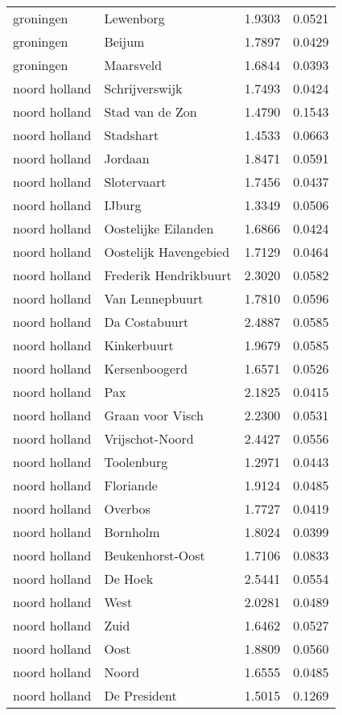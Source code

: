 \begin{longtable}{llcc}
groningen & Lewenborg & 1.9303 & 0.0521 \\
groningen & Beijum & 1.7897 & 0.0429 \\
groningen & Maarsveld & 1.6844 & 0.0393 \\
noord holland & Schrijverswijk & 1.7493 & 0.0424 \\
noord holland & Stad van de Zon & 1.4790 & 0.1543 \\
noord holland & Stadshart & 1.4533 & 0.0663 \\
noord holland & Jordaan & 1.8471 & 0.0591 \\
noord holland & Slotervaart & 1.7456 & 0.0437 \\
noord holland & IJburg & 1.3349 & 0.0506 \\
noord holland & Oostelijke Eilanden & 1.6866 & 0.0424 \\
noord holland & Oostelijk Havengebied & 1.7129 & 0.0464 \\
noord holland & Frederik Hendrikbuurt & 2.3020 & 0.0582 \\
noord holland & Van Lennepbuurt & 1.7810 & 0.0596 \\
noord holland & Da Costabuurt & 2.4887 & 0.0585 \\
noord holland & Kinkerbuurt & 1.9679 & 0.0585 \\
noord holland & Kersenboogerd & 1.6571 & 0.0526 \\
noord holland & Pax & 2.1825 & 0.0415 \\
noord holland & Graan voor Visch & 2.2300 & 0.0531 \\
noord holland & Vrijschot-Noord & 2.4427 & 0.0556 \\
noord holland & Toolenburg & 1.2971 & 0.0443 \\
noord holland & Floriande & 1.9124 & 0.0485 \\
noord holland & Overbos & 1.7727 & 0.0419 \\
noord holland & Bornholm & 1.8024 & 0.0399 \\
noord holland & Beukenhorst-Oost & 1.7106 & 0.0833 \\
noord holland & De Hoek & 2.5441 & 0.0554 \\
noord holland & West & 2.0281 & 0.0489 \\
noord holland & Zuid & 1.6462 & 0.0527 \\
noord holland & Oost & 1.8809 & 0.0560 \\
noord holland & Noord & 1.6555 & 0.0485 \\
noord holland & De President & 1.5015 & 0.1269 \\

\end{longtable}

